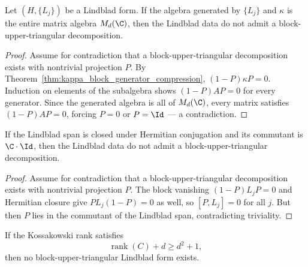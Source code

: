 \begin{theorem}%
    \label{thm:full_algebra_gen_no_block_ut}
    \leanok
    Let $(H, \{L_j\})$ be a Lindblad form.
    If the algebra generated by $\{L_j\}$ and $\kappa$ is the entire
    matrix algebra $M_d(\C)$, then the Lindblad data do not admit a
    block-upper-triangular decomposition.
\end{theorem}
\begin{proof}\leanok
    Assume for contradiction that a block-upper-triangular decomposition
    exists with nontrivial projection $P$.
    By Theorem~\ref{thm:kappa_block_generator_compression},
    $(1-P)\kappa P = 0$.
    Induction on elements of the subalgebra shows
    $(1-P)A P = 0$ for every generator. Since the generated algebra is
    all of $M_d(\C)$, every matrix satisfies $(1-P)AP = 0$, forcing
    $P = 0$ or $P = \Id$ --- a contradiction.
\end{proof}

\begin{theorem}%
    \label{thm:herm_span_trivial_commutant_no_block_ut}
    \leanok
    If the Lindblad span is closed under Hermitian conjugation and its
    commutant is $\C \cdot \Id$, then the Lindblad data do not admit a
    block-upper-triangular decomposition.
\end{theorem}
\begin{proof}\leanok
    Assume for contradiction that a block-upper-triangular decomposition
    exists with nontrivial projection $P$. The block vanishing
    $(1-P)L_j P = 0$ and Hermitian closure give $P L_j (1-P) = 0$ as
    well, so $[P, L_j] = 0$ for all $j$. But then $P$ lies in the
    commutant of the Lindblad span, contradicting triviality.
\end{proof}

\begin{theorem}
    \label{thm:large_kossakowski_rank_no_block_ut_ch12}
    \leanok
    If the Kossakowski rank satisfies
    \[
        \operatorname{rank}(C) + d \ge d^2 + 1,
    \]
    then no block-upper-triangular Lindblad form exists.
\end{theorem}

